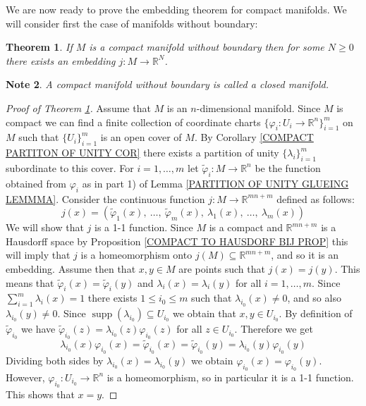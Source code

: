 \documentclass[11pt, letterpaper, oneside]{report}
\theoremstyle{pplain}
\newtheorem{theorem}{Theorem}[chapter]
\newtheorem{ITERMVALUE THM}[theorem]{Intermediate Value Theorem}
\newtheorem{HEINEBOREL THM}[theorem]{Heine-Borel Theorem}
\newtheorem{UMETR THM}[theorem]{Urysohn Metrization Theorem}
\newtheorem{UMETR2 THM}[theorem]{Urysohn Metrization Theorem (v.2)}
\theoremstyle{ddefinition}
\newtheorem{note}[theorem]{Note}
\theoremstyle{nnn}
\newtheorem{TDA NN}[theorem]{Topological Data Analysis. }
\theoremstyle{eexercise}
\newcommand{\R}{{\mathbb R}}
\DeclareMathOperator\supp{supp}
\begin{document}
We are now ready to prove the embedding theorem for compact manifolds. We will consider first
the case of manifolds without boundary:

\begin{theorem}
\label{CLOSED MANIFOLD EMBEDDING THM}
If $M$ is a compact manifold without boundary then for some $N \geq 0$ there exists an embedding 
$j\colon M \to \R^{N}$. 
\end{theorem} 

\begin{note}
A compact manifold without boundary is called a \emph{closed manifold}. 
\end{note}


\begin{proof}[Proof of Theorem \ref{CLOSED MANIFOLD EMBEDDING THM}]
Assume that $M$ is an $n$-dimensional manifold. Since $M$ is compact we can find a finite 
collection of coordinate charts $\{\varphi_{i}\colon U_{i} \to \R^{n}\}_{i=1}^{m}$ on $M$ such that 
$\{U_{i}\}_{i=1}^{m}$ is an open cover of $M$. By Corollary \ref{COMPACT PARTITON OF UNITY COR}
there exists a partition of unity $\{\lambda_{i}\}_{i=1}^{m}$ subordinate to this cover. 
For $i = 1, \dots, m$ let $\tilde{\varphi}_{i} \colon M \to \R^{n}$ be the function obtained from $\varphi_{i}$
as in part 1) of Lemma \ref{PARTITION OF UNITY GLUEING LEMMMA}. Consider the continuous function 
$j\colon M \to \R^{mn+m}$ defined as follows: 
$$j(x) = (\tilde{\varphi}_{1}(x), \ \dots, \ \tilde{\varphi}_{m}(x), \ \lambda_{1}(x), \ \dots, \ \lambda_{m}(x))$$
We will show that $j$ is a 1-1 function. Since $M$ is a compact and $ \R^{mn+m}$ is a Hausdorff space
by Proposition \ref{COMPACT TO HAUSDORF BIJ PROP} this will imply that  $j$ is a homeomorphism 
onto $j(M)\subseteq \R^{mn+m}$, and so it is an embedding. 
Assume then that $x, y\in M$ are points such that $j(x) = j(y)$. This means that  
$\tilde{\varphi}_{i}(x) = \tilde{\varphi}_{i}(y)$ and $\lambda_{i}(x) = \lambda_{i}(y)$ for all $i=1, \dots, m$. 
Since $\sum_{i=1}^{m}\lambda_{i}(x) =1$
there exists $1\leq i_{0}\leq m$ such that $\lambda_{i_{0}}(x) \neq 0$, and so also $\lambda_{i_{0}}(y) \neq 0$. Since $\supp(\lambda_{i_{0}})\subseteq U_{i_{0}}$ we obtain that  $x, y\in U_{i_{0}}$.  
By definition of $\tilde{\varphi}_{i_{0}}$ we have 
$\tilde{\varphi}_{i_{0}}(z) = \lambda_{i_{0}}(z)\varphi_{i_{0}}(z)$ for all $z\in U_{i_{0}}$. Therefore we get
$$\lambda_{i_{0}}(x)\varphi_{i_{0}}(x) = \tilde{\varphi}_{i_{0}}(x) 
= \tilde{\varphi}_{i_{0}}(y) = \lambda_{i_{0}}(y)\varphi_{i_{0}}(y)$$
Dividing both sides by $\lambda_{i_{0}}(x) = \lambda_{i_{0}}(y)$ we obtain 
$\varphi_{i_{0}}(x) = \varphi_{i_{0}}(y)$. 
However, $\varphi_{i_{0}}\colon U_{i_{0}} \to \R^{n}$ is a homeomorphism, so in particular it is a 
1-1 function. This shows that $x=y$. 
\end{proof}
\end{document}
